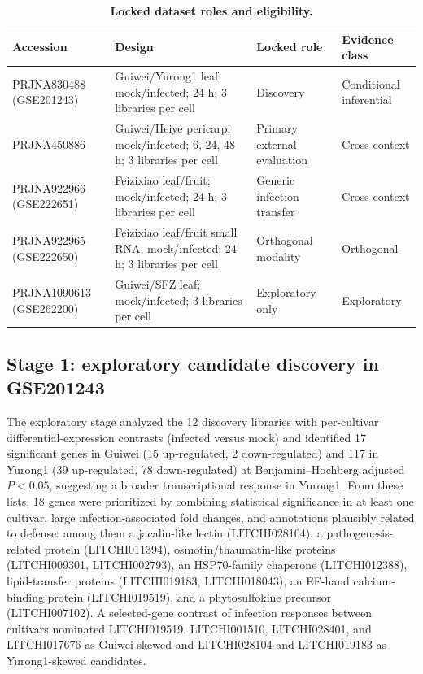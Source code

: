 \documentclass[11pt]{article}
\begin{document}
\begin{table}[t]
\centering
\caption{\textbf{Locked dataset roles and eligibility.}}
\label{tab:roles}
\small
\begin{tabular}{@{}p{3.2cm}p{5.6cm}p{3.3cm}p{2.6cm}@{}}
\toprule
\textbf{Accession} & \textbf{Design} & \textbf{Locked role} & \textbf{Evidence class} \\
\midrule
PRJNA830488 (GSE201243) & Guiwei/Yurong1 leaf; mock/infected; 24 h; 3 libraries per cell & Discovery & Conditional inferential \\
PRJNA450886 & Guiwei/Heiye pericarp; mock/infected; 6, 24, 48 h; 3 libraries per cell & Primary external evaluation & Cross-context \\
PRJNA922966 (GSE222651) & Feizixiao leaf/fruit; mock/infected; 24 h; 3 libraries per cell & Generic infection transfer & Cross-context \\
PRJNA922965 (GSE222650) & Feizixiao leaf/fruit small RNA; mock/infected; 24 h; 3 libraries per cell & Orthogonal modality & Orthogonal \\
PRJNA1090613 (GSE262200) & Guiwei/SFZ leaf; mock/infected; 3 libraries per cell & Exploratory only & Exploratory \\
\bottomrule
\end{tabular}
\end{table}

\subsection{Stage 1: exploratory candidate discovery in GSE201243}

The exploratory stage analyzed the 12 discovery libraries with per-cultivar differential-expression contrasts (infected versus mock) and identified 17 significant genes in Guiwei (15 up-regulated, 2 down-regulated) and 117 in Yurong1 (39 up-regulated, 78 down-regulated) at Benjamini--Hochberg adjusted $P<0.05$, suggesting a broader transcriptional response in Yurong1. From these lists, 18 genes were prioritized by combining statistical significance in at least one cultivar, large infection-associated fold changes, and annotations plausibly related to defense: among them a jacalin-like lectin (LITCHI028104), a pathogenesis-related protein (LITCHI011394), osmotin/thaumatin-like proteins (LITCHI009301, LITCHI002793), an HSP70-family chaperone (LITCHI012388), lipid-transfer proteins (LITCHI019183, LITCHI018043), an EF-hand calcium-binding protein (LITCHI019519), and a phytosulfokine precursor (LITCHI007102). A selected-gene contrast of infection responses between cultivars nominated LITCHI019519, LITCHI001510, LITCHI028401, and LITCHI017676 as Guiwei-skewed and LITCHI028104 and LITCHI019183 as Yurong1-skewed candidates.
\end{document}
